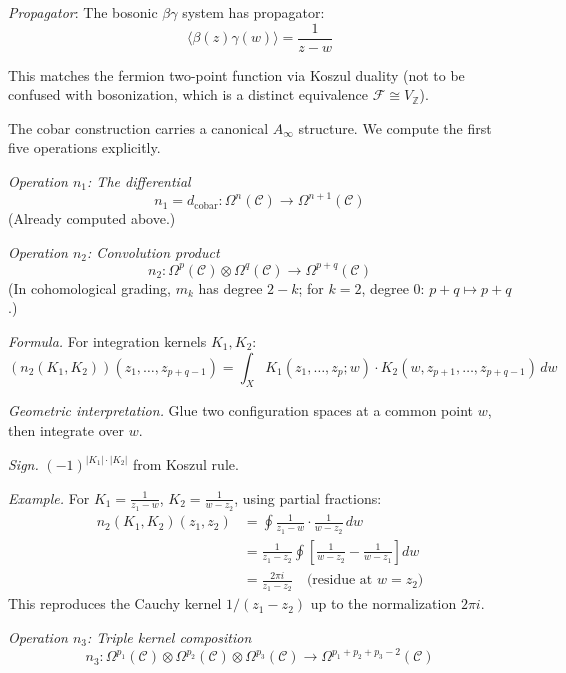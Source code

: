 \begin{example}
\emph{Propagator}: The bosonic $\beta\gamma$ system has propagator:
\[\langle \beta(z) \gamma(w) \rangle = \frac{1}{z - w}\]

This matches the fermion two-point function via Koszul duality (not to be confused with bosonization, which is a distinct equivalence $\mathcal{F} \cong V_{\mathbb{Z}}$).
\end{example}

\begin{example}
\label{ex:cobar-ainfty-n5}

The cobar construction carries a canonical $A_\infty$ structure. We compute the
first five operations explicitly.

\emph{Operation $n_1$: The differential}
\[n_1 = d_{\text{cobar}}: \Omega^n(\mathcal{C}) \to \Omega^{n+1}(\mathcal{C})\]
(Already computed above.)

\emph{Operation $n_2$: Convolution product}
\[n_2: \Omega^p(\mathcal{C}) \otimes \Omega^q(\mathcal{C}) \to \Omega^{p+q}(\mathcal{C})\]
(In cohomological grading, $m_k$ has degree $2-k$; for $k=2$, degree $0$: $p+q \mapsto p+q$.)

\emph{Formula.} For integration kernels $K_1, K_2$:
\[(n_2(K_1, K_2))(z_1, \ldots, z_{p+q-1}) = \int_X K_1(z_1, \ldots, z_p; w) \cdot
K_2(w, z_{p+1}, \ldots, z_{p+q-1}) \, dw\]

\emph{Geometric interpretation.} Glue two configuration spaces at a common point
$w$, then integrate over $w$.

\emph{Sign.} $(-1)^{|K_1| \cdot |K_2|}$ from Koszul rule.

\emph{Example.} For $K_1 = \frac{1}{z_1 - w}$, $K_2 = \frac{1}{w - z_2}$, using partial fractions:
\begin{align*}
n_2(K_1, K_2)(z_1, z_2) &= \oint \frac{1}{z_1 - w} \cdot \frac{1}{w - z_2} \, dw \\
&= \frac{1}{z_1 - z_2}\oint \left[\frac{1}{w - z_2} - \frac{1}{w - z_1}\right] dw \\
&= \frac{2\pi i}{z_1 - z_2} \quad \text{(residue at } w = z_2\text{)}
\end{align*}
This reproduces the Cauchy kernel $1/(z_1-z_2)$ up to the
normalization $2\pi i$.

\emph{Operation $n_3$: Triple kernel composition}
\[n_3: \Omega^{p_1}(\mathcal{C}) \otimes \Omega^{p_2}(\mathcal{C}) \otimes
\Omega^{p_3}(\mathcal{C}) \to \Omega^{p_1+p_2+p_3-2}(\mathcal{C})\]


\end{example}
